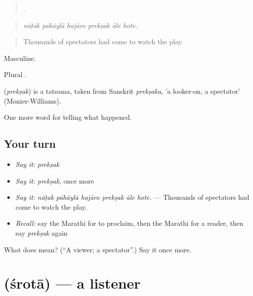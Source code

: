 \begin{quote}
     .
\end{quote}

\begin{quote}
\emph{nāṭak pāhāylā hajāro prekṣak āle hote.}
\end{quote}

\begin{quote}
Thousands of spectators had come to watch the play.
\end{quote}

Masculine.

Plural .

\begin{cousinweb}
\textbf{} (\emph{prekṣak}) is a tatsama, taken from Sanskrit \emph{prekṣaka}, 'a looker-on, a spectator' (Monier-Williams).
\end{cousinweb}

\begin{grammarlens}[title={What you've built}]
One more word for telling what happened.
\end{grammarlens}

\subsection*{Your turn}
\begin{itemize}
\raggedright
  \item \emph{Say it:} \emph{prekṣak}
  \item \emph{Say it:} \emph{prekṣak}, once more
  \item \emph{Say it:} \emph{nāṭak pāhāylā hajāro prekṣak āle hote.} — Thousands of spectators had come to watch the play.
  \item \emph{Recall:} say the Marathi for to proclaim, then the Marathi for a reader, then say \emph{prekṣak} again
\end{itemize}

\begin{tcolorbox}[breakable,colback=teal!4,colframe=teal!35!black,title={Before you move on}]
What does  mean? (\textquotedblleft{}A viewer; a spectator\textquotedblright{}.) Say it once more.
\end{tcolorbox}
\section[\texorpdfstring{\mr{श्रोता} (śrotā)}{श्रोता (śrotā)}]{ (śrotā) — a listener}

